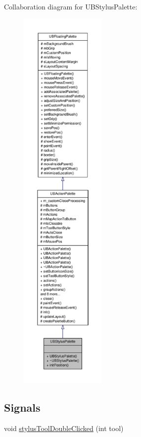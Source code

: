 Collaboration diagram for U\-B\-Stylus\-Palette\-:
\nopagebreak
\begin{figure}[H]
\begin{center}
\leavevmode
\includegraphics[height=550pt]{da/d2c/class_u_b_stylus_palette__coll__graph}
\end{center}
\end{figure}
\subsection*{Signals}
\begin{DoxyCompactItemize}
\item 
void \hyperlink{class_u_b_stylus_palette_a8776640958a3430b432da313a8a247d9}{stylus\-Tool\-Double\-Clicked} (int tool)
\end{DoxyCompactItemize}
